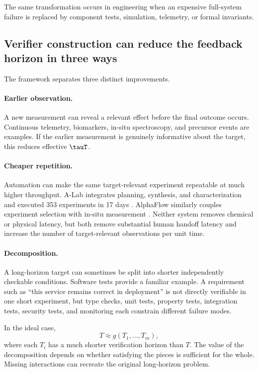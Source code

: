 The same transformation occurs in engineering when an expensive full-system failure
is replaced by component tests, simulation, telemetry, or formal invariants.

\subsection{Verifier construction can reduce the feedback horizon in three ways}

The framework separates three distinct improvements.

\paragraph{Earlier observation.}
A new measurement can reveal a relevant effect before the final outcome occurs.
Continuous telemetry, biomarkers, in-situ spectroscopy, and precursor events are
examples.  If the earlier measurement is genuinely informative about the target, this
reduces effective \(\tauT\).

\paragraph{Cheaper repetition.}
Automation can make the same target-relevant experiment repeatable at much higher
throughput.  A-Lab integrates planning, synthesis, and characterization and executed
353 experiments in 17 days \parencite{szymanski2023alab}.  AlphaFlow similarly couples
experiment selection with in-situ measurement
\parencite{volk2023alphaflow}.  Neither system removes chemical or physical latency, but
both remove substantial human handoff latency and increase the number of
target-relevant observations per unit time.

\paragraph{Decomposition.}
A long-horizon target can sometimes be split into shorter independently checkable
conditions.  Software tests provide a familiar example.  A requirement such as
``this service remains correct in deployment'' is not directly verifiable in one short
experiment, but type checks, unit tests, property tests, integration tests, security
tests, and monitoring each constrain different failure modes.

In the ideal case,
\[
    T \approx g(T_1,\ldots,T_m),
\]
where each \(T_i\) has a much shorter verification horizon than \(T\).  The value of
the decomposition depends on whether satisfying the pieces is sufficient for the
whole.  Missing interactions can recreate the original long-horizon problem.

